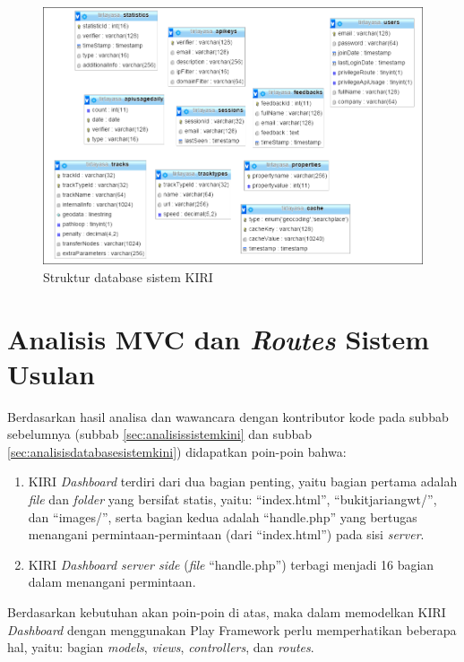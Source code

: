 \begin{figure}[htbp]
	\centering
		\includegraphics[scale=0.7]{Gambar/4_strukturdatabase.PNG}
	\caption{Struktur database sistem KIRI}
	\label{fig:4_strukturdatabase}
\end{figure}


\section{Analisis MVC dan \textit{Routes} Sistem Usulan}
\label{sec:analisismvcdantextitroutessistemusulan}
Berdasarkan hasil analisa dan wawancara dengan kontributor kode pada subbab sebelumnya (subbab \ref{sec:analisissistemkini} dan subbab \ref{sec:analisisdatabasesistemkini}) didapatkan poin-poin bahwa:
\begin{enumerate}
	\item KIRI \textit{Dashboard} terdiri dari dua bagian penting, yaitu bagian pertama adalah \textit{file} dan \textit{folder} yang bersifat statis, yaitu: ``index.html'', ``bukitjariangwt/'', dan ``images/'', serta bagian kedua adalah ``handle.php'' yang bertugas menangani permintaan-permintaan (dari ``index.html'') pada sisi \textit{server}.
	\item KIRI \textit{Dashboard server side} (\textit{file} ``handle.php'') terbagi menjadi 16 bagian dalam menangani permintaan.
\end{enumerate}

Berdasarkan kebutuhan akan poin-poin di atas, maka dalam memodelkan KIRI \textit{Dashboard} dengan menggunakan Play Framework perlu memperhatikan beberapa hal, yaitu: bagian \textit{models}, \textit{views}, \textit{controllers}, dan \textit{routes}.

